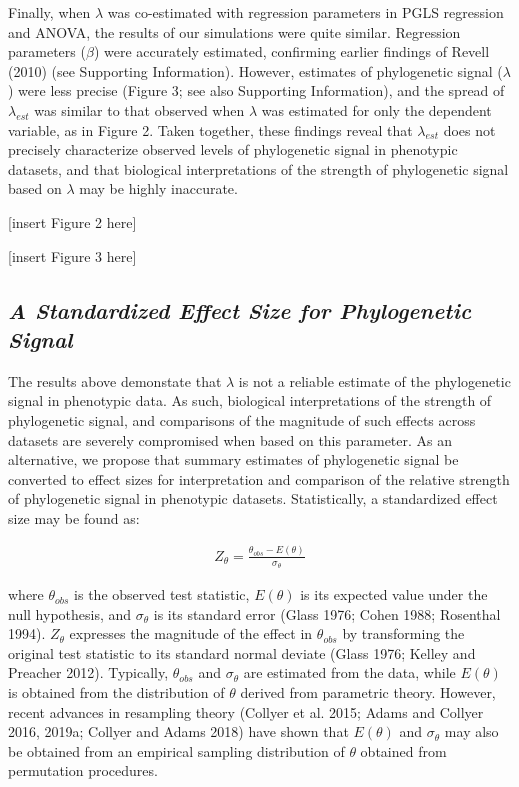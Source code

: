 \documentclass[
]{article}
\begin{document}
Finally, when \(\lambda\) was co-estimated with regression parameters in
PGLS regression and ANOVA, the results of our simulations were quite
similar. Regression parameters (\(\beta\)) were accurately estimated,
confirming earlier findings of Revell (2010) (see Supporting
Information). However, estimates of phylogenetic signal (\(\lambda\))
were less precise (Figure 3; see also Supporting Information), and the
spread of \(\lambda_{est}\) was similar to that observed when
\(\lambda\) was estimated for only the dependent variable, as in Figure
2. Taken together, these findings reveal that \(\lambda_{est}\) does not
precisely characterize observed levels of phylogenetic signal in
phenotypic datasets, and that biological interpretations of the strength
of phylogenetic signal based on \(\lambda\) may be highly inaccurate.
\hfill\break

{[}insert Figure 2 here{]} \hfill\break

{[}insert Figure 3 here{]} \hfill\break 

\hypertarget{a-standardized-effect-size-for-phylogenetic-signal}{%
\subsection{\texorpdfstring{\emph{A Standardized Effect Size for
Phylogenetic
Signal}}{A Standardized Effect Size for Phylogenetic Signal}}\label{a-standardized-effect-size-for-phylogenetic-signal}}

The results above demonstate that \(\lambda\) is not a reliable estimate
of the phylogenetic signal in phenotypic data. As such, biological
interpretations of the strength of phylogenetic signal, and comparisons
of the magnitude of such effects across datasets are severely
compromised when based on this parameter. As an alternative, we propose
that summary estimates of phylogenetic signal be converted to effect
sizes for interpretation and comparison of the relative strength of
phylogenetic signal in phenotypic datasets. Statistically, a
standardized effect size may be found as:

\begin{align}
    Z_{\theta}=\frac{\theta_{obs}-E(\theta)}{\sigma_\theta}
\end{align}

where \(\theta_{obs}\) is the observed test statistic, \(E(\theta)\) is
its expected value under the null hypothesis, and \(\sigma_\theta\) is
its standard error (Glass 1976; Cohen 1988; Rosenthal 1994).
\(Z_{\theta}\) expresses the magnitude of the effect in \(\theta_{obs}\)
by transforming the original test statistic to its standard normal
deviate (Glass 1976; Kelley and Preacher 2012). Typically,
\(\theta_{obs}\) and \(\sigma_\theta\) are estimated from the data,
while \(E(\theta)\) is obtained from the distribution of \(\theta\)
derived from parametric theory. However, recent advances in resampling
theory (Collyer et al. 2015; Adams and Collyer 2016, 2019a; Collyer and
Adams 2018) have shown that \(E(\theta)\) and \(\sigma_\theta\) may also
be obtained from an empirical sampling distribution of \(\theta\)
obtained from permutation procedures. \hfill\break
\end{document}
